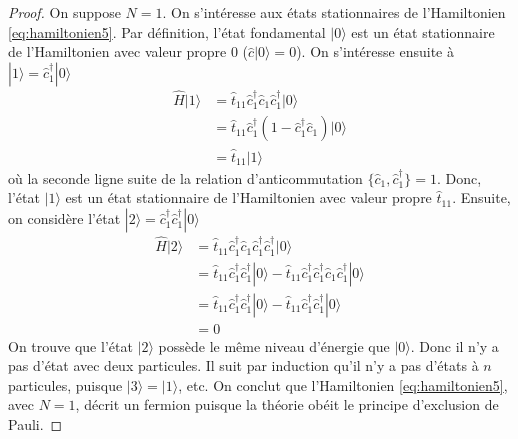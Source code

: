 \documentclass{article}
\numberwithin{equation}{section}
\theoremstyle{solution}
\begin{document}
\begin{proof}
On suppose $N=1$. On s'intéresse aux états stationnaires de l'Hamiltonien \eqref{eq:hamiltonien5}. Par définition, 
l'état fondamental $| 0 \rangle $ est un état stationnaire de l'Hamiltonien avec valeur propre $0$ ($\hat{c} | 0 \rangle  = 0$). 
On s'intéresse ensuite à $| 1 \rangle = \hat{c}^{\dagger}_1 | 0 \rangle $
\begin{align*}
        \hat{H}| 1 \rangle &= \hat{t}_{11} \hat{c}^{\dagger}_1 \hat{c}_1 \hat{c}^{\dagger}_1 | 0 \rangle \\
        &= \hat{t}_{11} \hat{c}^{\dagger}_1 (1 - \hat{c}^{\dagger}_1 \hat{c}_1)| 0 \rangle \\
        &= \hat{t}_{11}| 1 \rangle 
\end{align*}
où la seconde ligne suite de la relation d'anticommutation $\{\hat{c}_1, \hat{c}^{\dagger}_1\} = 1$.
Donc, l'état $| 1 \rangle $ est un état stationnaire de l'Hamiltonien avec valeur propre $\hat{t}_{11}$. 
Ensuite, on considère l'état $| 2 \rangle = \hat{c}^{\dagger}_1 \hat{c}^{\dagger}_1 | 0 \rangle $
\begin{align*}
        \hat{H} | 2 \rangle &= \hat{t}_{11} \hat{c}^{\dagger}_1 \hat{c}_1 \hat{c}^{\dagger}_1 \hat{c}^{\dagger}_1 | 0 \rangle  \\
                &= \hat{t}_{11}\hat{c}^{\dagger}_1\hat{c}^{\dagger}_1 | 0 \rangle  - \hat{t}_{11}\hat{c}^{\dagger}_1\hat{c}^{\dagger}_1 \hat{c}_1\hat{c}^{\dagger}_1 | 0 \rangle  \\
                &= \hat{t}_{11}\hat{c}^{\dagger}_1\hat{c}^{\dagger}_1 | 0 \rangle  - \hat{t}_{11}\hat{c}^{\dagger}_1\hat{c}^{\dagger}_1 | 0 \rangle  \\
                &= 0
\end{align*}
On trouve que l'état $| 2 \rangle $ possède le même niveau d'énergie que $| 0 \rangle $.
Donc il n'y a pas d'état avec deux particules. Il suit par induction 
qu'il n'y a pas d'états à $n$ particules, puisque $| 3 \rangle = | 1 \rangle $, etc.
On conclut que l'Hamiltonien \eqref{eq:hamiltonien5}, avec $N=1$, décrit un fermion puisque la théorie obéit le principe d'exclusion de Pauli.
\end{proof}
\end{document}

